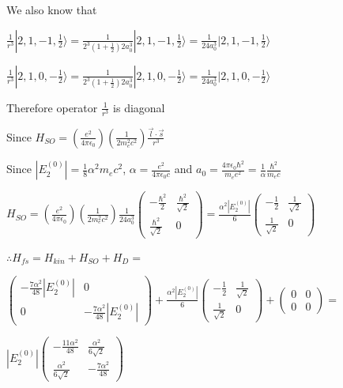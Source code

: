 \documentclass[12pt]{article}
\begin{document}
\begin{spacing}{2.0}
We also know that

$\frac{1}{r^3}|2,1,-1,\frac{1}{2}\rangle = \frac{1}{2^3\left(1+\frac{1}{2}\right)2a_0^3} |2,1,-1,\frac{1}{2}\rangle= \frac{1}{24 a_0^3} |2,1,-1,\frac{1}{2}\rangle$

$\frac{1}{r^3}|2,1,0,-\frac{1}{2}\rangle = \frac{1}{2^3\left(1+\frac{1}{2}\right)2a_0^3} |2,1,0,-\frac{1}{2}\rangle= \frac{1}{24 a_0^3} |2,1,0,-\frac{1}{2}\rangle$

Therefore operator $\frac{1}{r^3}$ is diagonal

Since $H_{SO}= \left( \frac{e^2}{4\pi \epsilon_0}\right) \left(\frac{1}{2m_e^2 c^2} \right) \frac{\vec{l} \cdot \vec{s}}{r^3} $

Since $|E_2^{(0)}|=\frac{1}{8}\alpha^2m_ec^2 $, $\alpha=\frac{e^2}{4\pi \epsilon_0 c}$ and $a_0= \frac{4\pi\epsilon_0\hbar^2}{m_e e^2}= \frac{1}{\alpha} \frac{\hbar^2}{m_e c}$

$H_{SO}= \left( \frac{e^2}{4\pi \epsilon_0}\right) \left(\frac{1}{2m_e^2 c^2} \right) \frac{1}{24 a_0^3} \left(
\begin{array}{cc}
-\frac{\hbar^2}{2} & \frac{\hbar^2}{\sqrt{2}}\\
\frac{\hbar^2}{\sqrt{2}} & 0
\end{array}
\right)= \frac{\alpha^2|E_2^{(0)}|}{6} \left(
\begin{array}{cc}
-\frac{1}{2} & \frac{1}{\sqrt{2}}\\
\frac{1}{\sqrt{2}} & 0
\end{array}
\right)$

$\therefore H_{fs}=H_{kin}+H_{SO}+H_{D}= $

$\left(
\begin{array}{cc}
-\frac{7\alpha^2}{48} |E_2^{(0)}| & 0 \\
0 & -\frac{7\alpha^2}{48} |E_2^{(0)}|
\end{array}
\right) +
\frac{\alpha^2|E_2^{(0)}|}{6} \left(
\begin{array}{cc}
-\frac{1}{2} & \frac{1}{\sqrt{2} }\\
\frac{1}{\sqrt{2}} & 0
\end{array}
\right) +
\left(
\begin{array}{cc}
0 & 0 \\
0 & 0
\end{array}
\right)
= $

$|E_2^{(0)}| \left(
\begin{array}{cc}
-\frac{11\alpha^2}{48} & \frac{\alpha^2}{6\sqrt{2}} \\
\frac{\alpha^2}{6\sqrt{2}} & -\frac{7\alpha^2}{48}
\end{array}
\right)$


\end{spacing}
\end{document}
